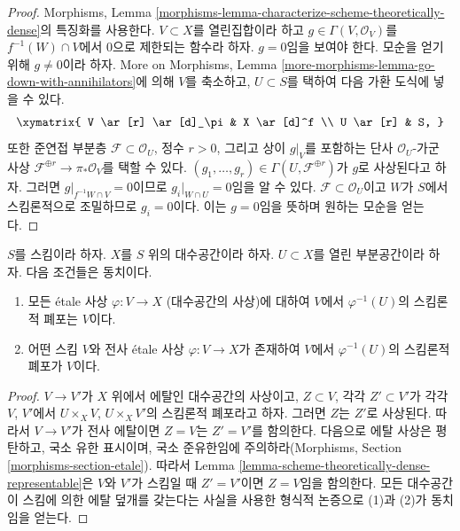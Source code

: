 \begin{proof}
Morphisms, Lemma
\ref{morphisms-lemma-characterize-scheme-theoretically-dense}의
특징화를 사용한다. $V \subset X$를 열린집합이라 하고
$g \in \Gamma(V, \mathcal{O}_V)$를 $f^{-1}(W) \cap V$에서
0으로 제한되는 함수라 하자.
$g = 0$임을 보여야 한다. 모순을 얻기 위해 $g \not = 0$이라 하자.
More on Morphisms, Lemma
\ref{more-morphisms-lemma-go-down-with-annihilators}에 의해
$V$를 축소하고, $U \subset S$를 택하여 다음 가환 도식에 넣을 수 있다.
$$
\xymatrix{
V \ar[r] \ar[d]_\pi & X \ar[d]^f \\
U \ar[r] & S,
}
$$
또한 준연접 부분층 $\mathcal{F} \subset \mathcal{O}_U$,
정수 $r > 0$, 그리고 상이 $g|_V$를 포함하는 단사
$\mathcal{O}_U$-가군 사상
$\mathcal{F}^{\oplus r} \to \pi_*\mathcal{O}_V$를 택할 수 있다.
$(g_1, \ldots, g_r) \in \Gamma(U, \mathcal{F}^{\oplus r})$가
$g$로 사상된다고 하자.
그러면 $g|_{f^{-1}W \cap V} = 0$이므로
$g_i|_{W \cap U} = 0$임을 알 수 있다.
$\mathcal{F} \subset \mathcal{O}_U$이고 $W$가 $S$에서
스킴론적으로 조밀하므로 $g_i = 0$이다.
이는 $g = 0$임을 뜻하며 원하는 모순을 얻는다.
\end{proof}

\begin{lemma}
\label{lemma-scheme-theoretically-dense}
$S$를 스킴이라 하자.
$X$를 $S$ 위의 대수공간이라 하자.
$U \subset X$를 열린 부분공간이라 하자.
다음 조건들은 동치이다.
\begin{enumerate}
\item 모든 \'etale 사상 $\varphi : V \to X$ (대수공간의 사상)에
대하여 $V$에서 $\varphi^{-1}(U)$의 스킴론적 폐포는 $V$이다.
\item 어떤 스킴 $V$와 전사 \'etale 사상
$\varphi : V \to X$가 존재하여 $V$에서 $\varphi^{-1}(U)$의
스킴론적 폐포가 $V$이다.
\end{enumerate}
\end{lemma}

\begin{proof}
$V \to V'$가 $X$ 위에서 에탈인 대수공간의 사상이고,
$Z \subset V$, 각각 $Z' \subset V'$가 각각 $V$, $V'$에서
$U \times_X V$, $U \times_X V'$의 스킴론적 폐포라고 하자.
그러면 $Z$는 $Z'$로 사상된다. 따라서 $V \to V'$가 전사 에탈이면
$Z = V$는 $Z' = V'$를 함의한다.
다음으로 에탈 사상은 평탄하고, 국소 유한 표시이며, 국소 준유한임에
주의하라(Morphisms, Section \ref{morphisms-section-etale}).
따라서 Lemma \ref{lemma-scheme-theoretically-dense-representable}은
$V$와 $V'$가 스킴일 때 $Z' = V'$이면 $Z = V$임을 함의한다.
모든 대수공간이 스킴에 의한 에탈 덮개를 갖는다는 사실을 사용한
형식적 논증으로 (1)과 (2)가 동치임을 얻는다.
\end{proof}

